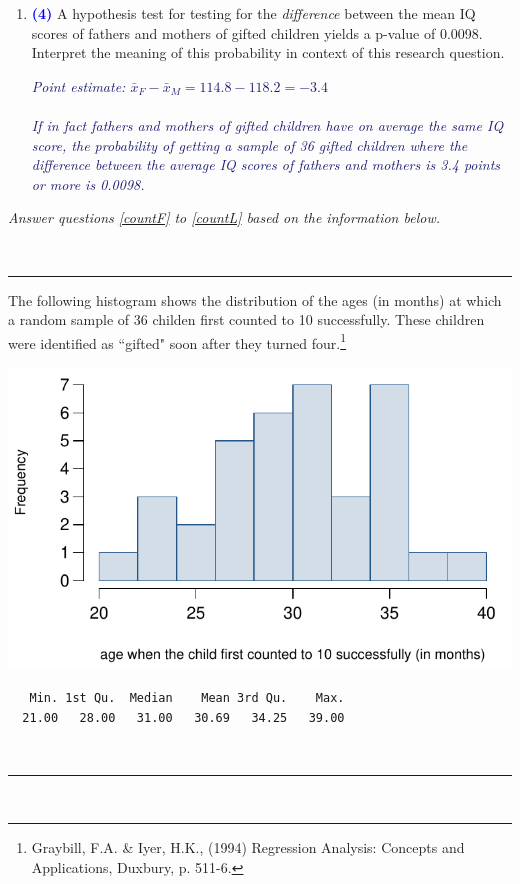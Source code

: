 \documentclass[11pt]{article}
\newcommand{\soln}[1]{\textcolor{MidnightBlue}{\textit{#1}}}	%
\newcommand{\pts}[1]{ \textbf{{\footnotesize \textcolor{blue}{(#1)}}} }	%
\begin{document}
\begin{enumerate}
\begin{enumerate}
\item \pts{4} A hypothesis test for testing for the \emph{difference} between the mean IQ scores of fathers and mothers of gifted children yields a p-value of 0.0098. Interpret the meaning of this probability in context of this research question.

\soln{Point estimate: $\bar{x}_F - \bar{x}_M = 114.8 - 118.2 = -3.4$\\
$\:$ \\
If in fact fathers and mothers of gifted children have on average the same IQ score, the probability of getting a sample of 36 gifted children where the difference between the average IQ scores of fathers and mothers is 3.4 points or more is 0.0098.}

\end{enumerate}
%

\pagebreak

\begin{center}
\textit{Answer questions \ref{countF} to \ref{countL} based on the information below.}
\end{center}
$\:$
\hrule
The following histogram shows the distribution of the ages (in months) at which a random sample of 36 childen first counted to 10 successfully. These children were identified as ``gifted" soon after they turned four.\footnote{Graybill, F.A. \& Iyer, H.K., (1994) Regression Analysis: Concepts and Applications, Duxbury, p. 511-6.}

\begin{minipage}[c]{0.5\textwidth}
\begin{center}
\includegraphics[width=\textwidth]{figures/gifted/count_hist}
\end{center}
\end{minipage}
\begin{minipage}[c]{0.5\textwidth}
\begin{center}
{\footnotesize
\begin{verbatim}
   Min. 1st Qu.  Median    Mean 3rd Qu.    Max. 
  21.00   28.00   31.00   30.69   34.25   39.00 
\end{verbatim}
}\end{center}
\end{minipage}
$\:$ \\
\hrule
$\:$


\end{enumerate}
\end{document}
